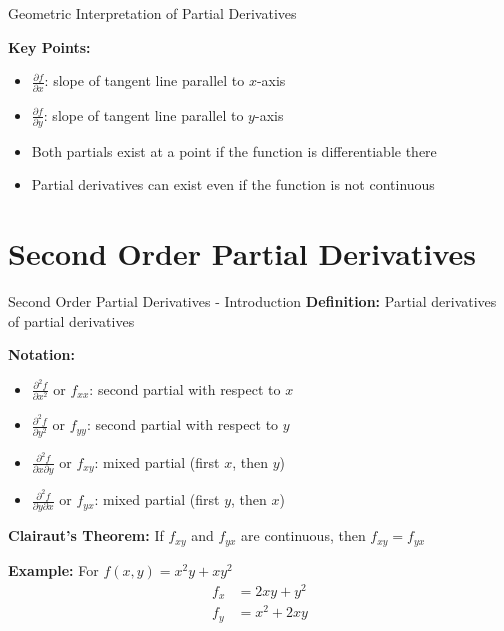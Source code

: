 \documentclass[aspectratio=169]{beamer}
\begin{document}
\begin{frame}{Geometric Interpretation of Partial Derivatives}
\begin{center}
\end{center}

\textbf{Key Points:}
\begin{itemize}
    \item $\frac{\partial f}{\partial x}$: slope of tangent line parallel to $x$-axis
    \item $\frac{\partial f}{\partial y}$: slope of tangent line parallel to $y$-axis
    \item Both partials exist at a point if the function is differentiable there
    \item Partial derivatives can exist even if the function is not continuous
\end{itemize}
\end{frame}

\section{Second Order Partial Derivatives}

\begin{frame}{Second Order Partial Derivatives - Introduction}
\textbf{Definition:} Partial derivatives of partial derivatives

\textbf{Notation:}
\begin{itemize}
    \item $\frac{\partial^2 f}{\partial x^2}$ or $f_{xx}$: second partial with respect to $x$
    \item $\frac{\partial^2 f}{\partial y^2}$ or $f_{yy}$: second partial with respect to $y$
    \item $\frac{\partial^2 f}{\partial x \partial y}$ or $f_{xy}$: mixed partial (first $x$, then $y$)
    \item $\frac{\partial^2 f}{\partial y \partial x}$ or $f_{yx}$: mixed partial (first $y$, then $x$)
\end{itemize}

\textbf{Clairaut's Theorem:} If $f_{xy}$ and $f_{yx}$ are continuous, then $f_{xy} = f_{yx}$

\textbf{Example:} For $f(x,y) = x^2y + xy^2$
\begin{align*}
    f_x &= 2xy + y^2 \\
    f_y &= x^2 + 2xy
\end{align*}
\end{frame}
\end{document}
